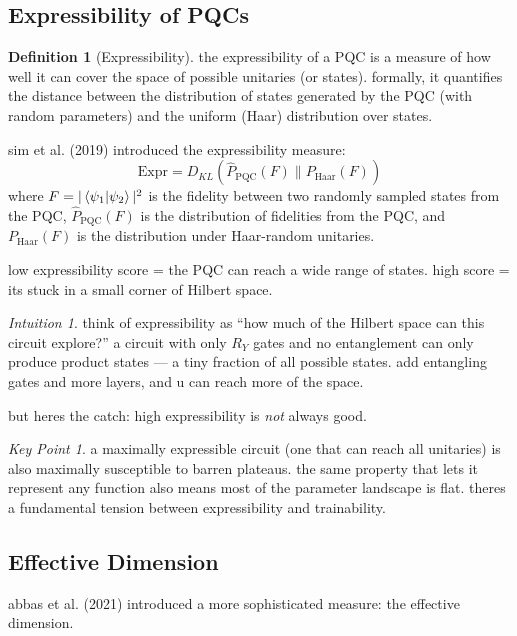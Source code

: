 \documentclass[11pt,a4paper]{article}
\theoremstyle{definition}
\newtheorem{definition}{Definition}[section]
\theoremstyle{remark}
\newtheorem*{intuition}{Intuition}
\newtheorem*{keypoint}{Key Point}
\begin{document}
\subsection{Expressibility of PQCs}

\begin{definition}[Expressibility]
the expressibility of a PQC is a measure of how well it can cover the space of possible unitaries (or states). formally, it quantifies the distance between the distribution of states generated by the PQC (with random parameters) and the uniform (Haar) distribution over states.
\end{definition}

sim et al. (2019) introduced the expressibility measure:
\[
\text{Expr} = D_{KL}\left(\hat{P}_{\text{PQC}}(F) \| P_{\text{Haar}}(F)\right)
\]
where $F = |\braket{\psi_1 | \psi_2}|^2$ is the fidelity between two randomly sampled states from the PQC, $\hat{P}_{\text{PQC}}(F)$ is the distribution of fidelities from the PQC, and $P_{\text{Haar}}(F)$ is the distribution under Haar-random unitaries.

low expressibility score = the PQC can reach a wide range of states. high score = its stuck in a small corner of Hilbert space.

\begin{intuition}
think of expressibility as ``how much of the Hilbert space can this circuit explore?'' a circuit with only $R_Y$ gates and no entanglement can only produce product states --- a tiny fraction of all possible states. add entangling gates and more layers, and u can reach more of the space.
\end{intuition}

but heres the catch: high expressibility is \emph{not} always good.

\begin{keypoint}
a maximally expressible circuit (one that can reach all unitaries) is also maximally susceptible to barren plateaus. the same property that lets it represent any function also means most of the parameter landscape is flat. theres a fundamental tension between expressibility and trainability.
\end{keypoint}

\subsection{Effective Dimension}

abbas et al. (2021) introduced a more sophisticated measure: the effective dimension.
\end{document}
